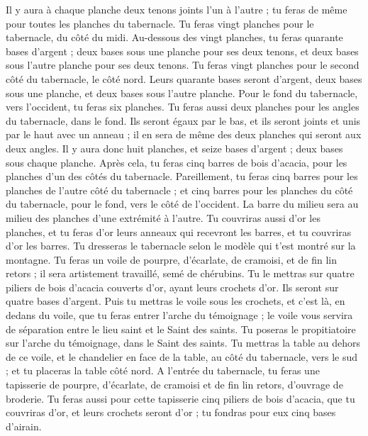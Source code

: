\begin{multicols}{2}
Il y aura à chaque planche deux tenons joints l’un à l’autre ; tu feras de même pour toutes les planches du tabernacle.
Tu feras vingt planches pour le tabernacle, du côté du midi.
Au-dessous des vingt planches, tu feras quarante bases d'argent ; deux bases sous une planche pour ses deux tenons, et deux bases sous l'autre planche pour ses deux tenons.
Tu feras vingt planches pour le second côté du tabernacle, le côté nord.
Leurs quarante bases seront d'argent, deux bases sous une planche, et deux bases sous l'autre planche.
Pour le fond du tabernacle, vers l'occident, tu feras six planches.
Tu feras aussi deux planches pour les angles du tabernacle, dans le fond.
Ils seront égaux par le bas, et ils seront joints et unis par le haut avec un anneau ; il en sera de même des deux planches qui seront aux deux angles.
Il y aura donc huit planches, et seize bases d'argent ; deux bases sous chaque planche.
Après cela, tu feras cinq barres de bois d’acacia, pour les planches d'un des côtés du tabernacle.
Pareillement, tu feras cinq barres pour les planches de l'autre côté du tabernacle ; et cinq barres pour les planches du côté du tabernacle, pour le fond, vers le côté de l'occident.
La barre du milieu sera au milieu des planches d’une extrémité à l’autre.
Tu couvriras aussi d'or les planches, et tu feras d'or leurs anneaux qui recevront les barres, et tu couvriras d'or les barres.
Tu dresseras le tabernacle selon le modèle qui t’est montré sur la montagne.
Tu feras un voile de pourpre, d'écarlate, de cramoisi, et de fin lin retors ; il sera artistement travaillé, semé de chérubins.
Tu le mettras sur quatre piliers de bois d’acacia couverts d'or, ayant leurs crochets d'or. Ils seront sur quatre bases d'argent.
Puis tu mettras le voile sous les crochets, et c’est là, en dedans du voile, que tu feras entrer l'arche du témoignage ; le voile vous servira de séparation entre le lieu saint et le Saint des saints.
Tu poseras le propitiatoire sur l'arche du témoignage, dans le Saint des saints.
Tu mettras la table au dehors de ce voile, et le chandelier en face de la table, au côté du tabernacle, vers le sud ; et tu placeras la table côté nord.
A l'entrée du tabernacle, tu feras une tapisserie de pourpre, d'écarlate, de cramoisi et de fin lin retors, d'ouvrage de broderie.
Tu feras aussi pour cette tapisserie cinq piliers de bois d’acacia, que tu couvriras d'or, et leurs crochets seront d'or ; tu fondras pour eux cinq bases d'airain.

\end{multicols}
